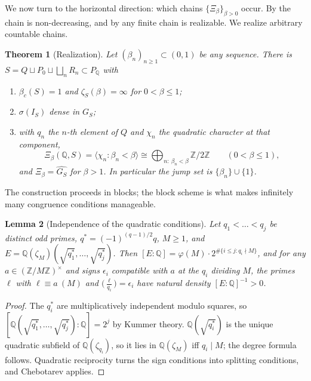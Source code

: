 \documentclass[11pt]{amsart}
\numberwithin{equation}{section}
\newtheorem{theorem}{Theorem}[section]
\newtheorem{lemma}[theorem]{Lemma}
\theoremstyle{definition}
\theoremstyle{remark}
\newcommand{\Z}{\mathbb{Z}}
\newcommand{\Q}{\mathbb{Q}}
\begin{document}
We now turn to the horizontal direction: which chains $\{\Xi_\beta\}_{\beta>0}$ occur. By
\cite[Lem.~3.5]{Main} the chain is non-decreasing, and by \cite[Prop.~4.16]{Main} any
finite chain is realizable. We realize arbitrary countable chains.

\begin{theorem}[Realization]\label{thm:realize}
Let $(\beta_n)_{n\ge1}\subset(0,1)$ be any sequence. There is $S=Q\sqcup P_0\sqcup\bigsqcup_nR_n\subset P_\Q$
with
\begin{enumerate}
\item $\beta_c(S)=1$ and $\zeta_S(\beta)=\infty$ for $0<\beta\le1$;
\item $\sigma(I_S)$ dense in $G_S$;
\item with $q_n$ the $n$-th element of $Q$ and $\chi_n$ the quadratic character at that
component,
\[
\Xi_\beta(\Q,S)=\bigl\langle\chi_n:\beta_n<\beta\bigr\rangle\cong\bigoplus_{n:\ \beta_n<\beta}\Z/2\Z
\qquad(0<\beta\le1),
\]
and $\Xi_\beta=\widehat{G_S}$ for $\beta>1$. In particular the jump set is
$\{\beta_n\}\cup\{1\}$.
\end{enumerate}
\end{theorem}

The construction proceeds in blocks; the block scheme is what makes infinitely many
congruence conditions manageable.

\begin{lemma}[Independence of the quadratic conditions]\label{lem:disjoint}
Let $q_1<\dots<q_j$ be distinct odd primes, $q^*=(-1)^{(q-1)/2}q$, $M\ge1$, and
$E=\Q(\zeta_M)(\sqrt{q_1^*},\dots,\sqrt{q_j^*})$. Then
$[E:\Q]=\varphi(M)\cdot2^{\#\{i\le j:q_i\nmid M\}}$, and for any $a\in(\Z/M\Z)^\times$ and
signs $\epsilon_i$ compatible with $a$ at the $q_i$ dividing $M$, the primes $\ell$ with
$\ell\equiv a\ (M)$ and $\bigl(\tfrac{\ell}{q_i}\bigr)=\epsilon_i$ have natural density
$[E:\Q]^{-1}>0$.
\end{lemma}

\begin{proof}
The $q_i^*$ are multiplicatively independent modulo squares, so
$[\Q(\sqrt{q_1^*},\dots,\sqrt{q_j^*}):\Q]=2^j$ by Kummer theory. $\Q(\sqrt{q_i^*})$ is the
unique quadratic subfield of $\Q(\zeta_{q_i})$, so it lies in $\Q(\zeta_M)$ iff $q_i\mid M$;
the degree formula follows. Quadratic reciprocity turns the sign conditions into splitting
conditions, and Chebotarev applies.
\end{proof}
\end{document}

